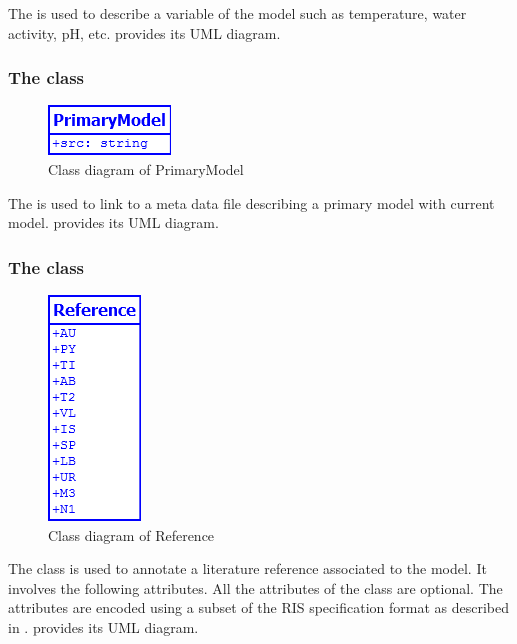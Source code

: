 \label{modelvariable-class}
The \ModelVariable is used to describe a variable of the model such as
temperature, water activity, pH, etc.  provides its UML
diagram.

\subsubsection{The  class}
\label{primarymodel-class}

\begin{figure}[h]
	\includegraphics[scale=0.8]{img/PrimaryModel}
	\caption{Class diagram of PrimaryModel}
	\label{PrimaryModel}
\end{figure}

The \PrimaryModel is used to link to a meta data file describing a primary model
with current model.  provides its UML diagram.

\subsubsection{The  class}
\begin{figure}[h]
	\includegraphics[scale=0.8]{img/Reference}
	\caption{Class diagram of Reference}
	\label{Reference}
\end{figure}

\label{reference-class}
The \Reference class is used to annotate a literature reference associated to
the model. It involves the following attributes. All the attributes of the
\Reference class are optional. The attributes are encoded using a subset of the
RIS specification format as described in .
 provides its UML diagram.

